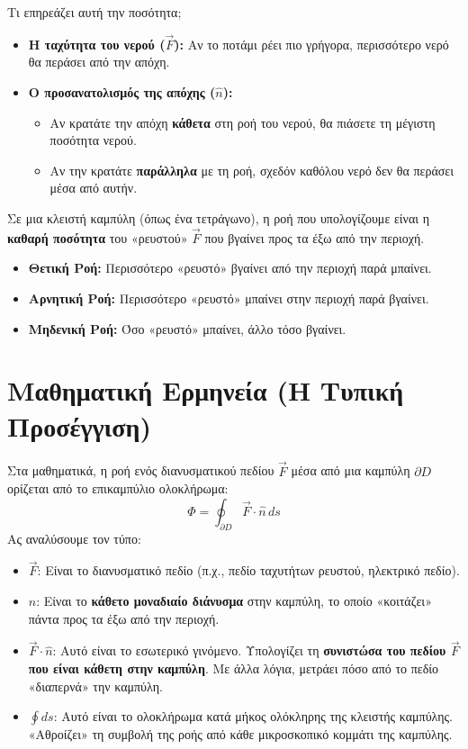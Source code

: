 \documentclass[a4paper,12pt,twoside]{article}
\begin{document}
Τι επηρεάζει αυτή την ποσότητα;
\begin{itemize}
    \item \textbf{Η ταχύτητα του νερού ($\vec{F}$):} Αν το ποτάμι ρέει πιο γρήγορα, περισσότερο νερό θα περάσει από την απόχη.
    \item \textbf{Ο προσανατολισμός της απόχης ($\hat{n}$):}
    \begin{itemize}
        \item Αν κρατάτε την απόχη \textbf{κάθετα} στη ροή του νερού, θα πιάσετε τη μέγιστη ποσότητα νερού.
        \item Αν την κρατάτε \textbf{παράλληλα} με τη ροή, σχεδόν καθόλου νερό δεν θα περάσει μέσα από αυτήν.
    \end{itemize}
\end{itemize}
Σε μια κλειστή καμπύλη (όπως ένα τετράγωνο), η ροή που υπολογίζουμε είναι η \textbf{καθαρή ποσότητα} του «ρευστού» $\vec{F}$ που βγαίνει προς τα έξω από την περιοχή.
\begin{itemize}
    \item \textbf{Θετική Ροή:} Περισσότερο «ρευστό» βγαίνει από την περιοχή παρά μπαίνει.
    \item \textbf{Αρνητική Ροή:} Περισσότερο «ρευστό» μπαίνει στην περιοχή παρά βγαίνει.
    \item \textbf{Μηδενική Ροή:} Όσο «ρευστό» μπαίνει, άλλο τόσο βγαίνει.
\end{itemize}

\section{Μαθηματική Ερμηνεία (Η Τυπική Προσέγγιση)}
Στα μαθηματικά, η ροή ενός διανυσματικού πεδίου $\vec{F}$ μέσα από μια καμπύλη $\partial D$ ορίζεται από το επικαμπύλιο ολοκλήρωμα:
\[ \Phi = \oint_{\partial D} \vec{F} \cdot \hat{n} \, ds \]
Ας αναλύσουμε τον τύπο:
\begin{itemize}
    \item $\vec{F}$: Είναι το διανυσματικό πεδίο (π.χ., πεδίο ταχυτήτων ρευστού, ηλεκτρικό πεδίο).
    \item $\hat{n}$: Είναι το \textbf{κάθετο μοναδιαίο διάνυσμα} στην καμπύλη, το οποίο «κοιτάζει» πάντα προς τα έξω από την περιοχή.
    \item $\vec{F} \cdot \hat{n}$: Αυτό είναι το εσωτερικό γινόμενο. Υπολογίζει τη \textbf{συνιστώσα του πεδίου $\vec{F}$ που είναι κάθετη στην καμπύλη}. Με άλλα λόγια, μετράει πόσο από το πεδίο «διαπερνά» την καμπύλη.
    \item $\oint ds$: Αυτό είναι το ολοκλήρωμα κατά μήκος ολόκληρης της κλειστής καμπύλης. «Αθροίζει» τη συμβολή της ροής από κάθε μικροσκοπικό κομμάτι της καμπύλης.
\end{itemize}
\end{document}
